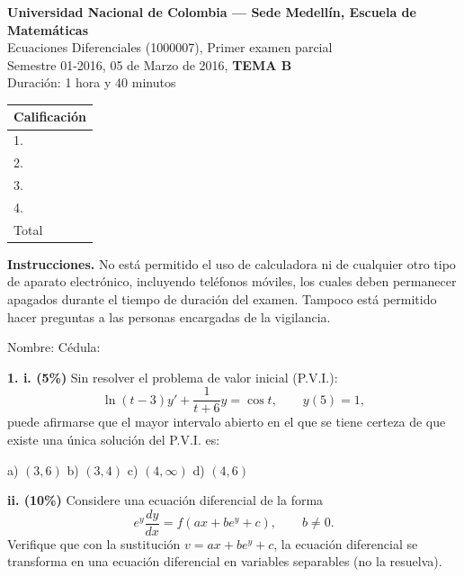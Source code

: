\documentclass[11pt]{article}
\begin{document}
\noindent
\begin{minipage}[t]{0.68\linewidth}
  {\bfseries\large Universidad Nacional de Colombia --- Sede Medellín, Escuela de Matemáticas}\\[2pt]
  {\small Ecuaciones Diferenciales (1000007), Primer examen parcial}\\
  {\small Semestre 01-2016, 05 de Marzo de 2016, \textbf{TEMA B}}\\
  {\small Duración: 1 hora y 40 minutos}
\end{minipage}%
\hfill
\begin{minipage}[t]{0.28\linewidth}
  \raggedleft
  \begin{tabular}{|l|c|}
  \hline
  \multicolumn{2}{|c|}{Calificación} \\
  \hline
  1. & \\ \hline
  2. & \\ \hline
  3. & \\ \hline
  4. & \\ \hline
  Total & \\ \hline
  \end{tabular}
\end{minipage}

\vspace{6pt}
\noindent\textbf{Instrucciones.} No está permitido el uso de calculadora ni de cualquier otro tipo de aparato electrónico, incluyendo teléfonos móviles, los cuales deben permanecer apagados durante el tiempo de duración del examen. Tampoco está permitido hacer preguntas a las personas encargadas de la vigilancia.

\vspace{8pt}
\noindent Nombre: \makebox[0.45\linewidth]{\hrulefill} \hfill Cédula: \makebox[0.3\linewidth]{\hrulefill}

\vspace{6pt}
\noindent\textbf{1. i. (5\%)} Sin resolver el problema de valor inicial (P.V.I.):
\[
\ln(t-3)y'+\frac{1}{t+6}y=\cos t, \qquad y(5)=1,
\]
puede afirmarse que el mayor intervalo abierto en el que se tiene certeza de que existe una única solución del P.V.I. es:

\begin{center}
a) $(3,6)$ \qquad b) $(3,4)$ \qquad c) $(4,\infty)$ \qquad d) $(4,6)$
\end{center}

\vspace{0.3cm}
\noindent\textbf{ii. (10\%)} Considere una ecuación diferencial de la forma
\[
e^y\frac{dy}{dx}=f(ax+be^y+c), \qquad b\neq 0.
\]
Verifique que con la sustitución $v=ax+be^y+c$, la ecuación diferencial se transforma en una ecuación diferencial en variables separables (no la resuelva).
\end{document}
